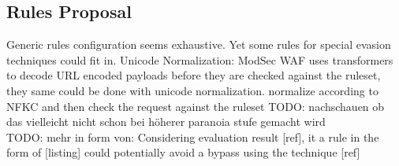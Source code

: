 \subsection{Rules Proposal}
Generic rules configuration seems exhaustive. Yet some rules for special evasion techniques could fit in.
Unicode Normalization: ModSec WAF uses transformers to decode URL encoded payloads before they are checked against the ruleset, they same could be done with unicode normalization. normalize according to NFKC and then check the request against the ruleset {\color{red} TODO: nachschauen ob das vielleicht nicht schon bei höherer paranoia stufe gemacht wird}
\\ 
{\color{red} TODO: mehr in form von: Considering evaluation result [ref], it a rule in the form of [listing] could potentially avoid a bypass using the technique [ref]}
